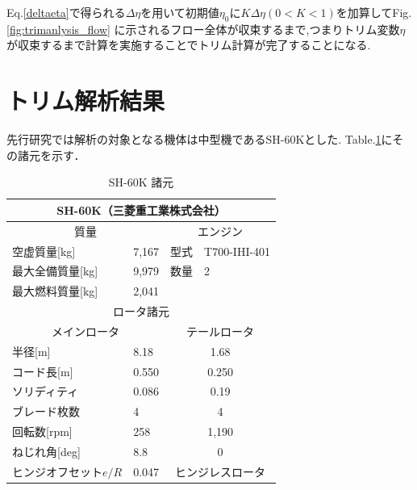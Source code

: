     Eq.\eqref{deltaeta}で得られる$\Delta\eta$を用いて初期値$\eta_{0}$に$K\Delta\eta(0 < K < 1)$を加算してFig.\ref{fig:trimanlysis_flow}
    に示されるフロー全体が収束するまで,つまりトリム変数$\eta$が収束するまで計算を実施することでトリム計算が完了することになる.

    \section{トリム解析結果}
    \label{sec:trim_analysis_result}
    
    \par
    先行研究では解析の対象となる機体は中型機であるSH-60Kとした.
    Table.\ref{table:SH60K}にその諸元を示す．

    \begin{table}[H]
        \centering
        \caption{SH-60K 諸元}
        \label{table:SH60K}
        \setlength{\tabcolsep}{5pt}
        \begin{tabular}{|l|l|l|l|}
            \hline \multicolumn{4}{|c|}{SH-60K（三菱重工業株式会社）} \\
            \hline \multicolumn{2}{|c|}{質量} & \multicolumn{2}{|c|}{エンジン} \\
            \hline 空虚質量[kg] & 7,167 & 型式 & T700-IHI-401 \\
            \hline 最大全備質量[kg] & 9,979 & 数量 & 2 \\
            \hline 最大燃料質量[kg] & 2,041 & & \\
            \hline \multicolumn{4}{|c|}{ロータ諸元} \\
            \hline \multicolumn{2}{|c|}{メインロータ} & \multicolumn{2}{|c|}{テールロータ} \\
            \hline 半径[m]& 8.18 &  \multicolumn{2}{|c|}{1.68} \\
            \hline コード長[m]& 0.550 &  \multicolumn{2}{|c|}{0.250} \\
            \hline ソリディティ & 0.086 &  \multicolumn{2}{|c|}{0.19} \\
            \hline ブレード枚数 & 4 &  \multicolumn{2}{|c|}{4} \\
            \hline 回転数[rpm] & 258 &  \multicolumn{2}{|c|}{1,190} \\
            \hline ねじれ角[deg]& 8.8 &  \multicolumn{2}{|c|}{0} \\
            \hline ヒンジオフセット$e/R$ & 0.047 & \multicolumn{2}{|c|}{ヒンジレスロータ} \\
            \hline 
        \end{tabular}
    \end{table}

